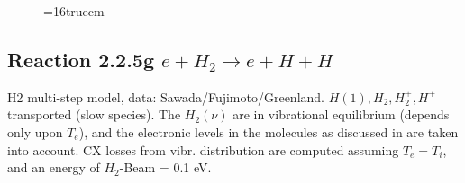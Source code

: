 \documentclass[12pt,dvips]{article}
\begin{document}
\begin{figure} \label{2.2.5}
\epsfxsize=16truecm
\end{figure}
\newpage


\subsection{
Reaction 2.2.5g   $e + H_2   \rightarrow e + H + H  $
}

H2 multi-step model,
data: Sawada/Fujimoto/Greenland.
$  H(1), H_2, H_2^+, H^+ $ transported (slow species).
The $H_2(\nu)$ are in vibrational equilibrium
(depends only upon $T_e$), and the electronic levels
in the molecules as discussed in \cite{kn:Sawada} are taken into
account. CX losses from vibr. distribution are computed assuming $T_e =
T_i$, and an energy of $H_2$-Beam  = 0.1 eV.
\end{document}
